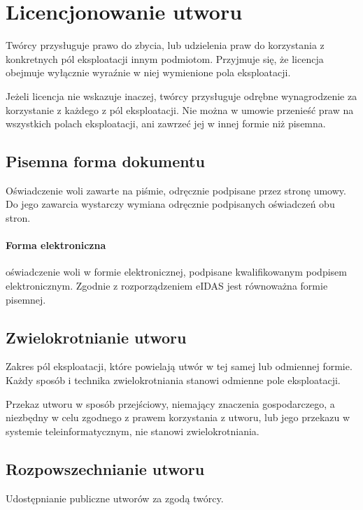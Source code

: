 \documentclass{article}
\begin{document}
\section{Licencjonowanie utworu}

Twórcy przysługuje prawo do zbycia, lub udzielenia praw do korzystania z konkretnych pól eksploatacji innym podmiotom.
Przyjmuje się, że licencja obejmuje wyłącznie wyraźnie w niej wymienione pola eksploatacji.

Jeżeli licencja nie wskazuje inaczej, twórcy przysługuje odrębne wynagrodzenie za korzystanie z każdego z pól eksploatacji. Nie można w umowie przenieść praw na wszystkich polach eksploatacji, ani zawrzeć jej w innej formie niż pisemna.

\subsection{Pisemna forma dokumentu}

Oświadczenie woli zawarte na piśmie, odręcznie podpisane przez stronę umowy. Do jego zawarcia wystarczy wymiana odręcznie podpisanych oświadczeń obu stron.

\paragraph{Forma elektroniczna}

oświadczenie woli w formie elektronicznej, podpisane kwalifikowanym podpisem elektronicznym. Zgodnie z rozporządzeniem eIDAS jest równoważna formie pisemnej.

\subsection{Zwielokrotnianie utworu}

Zakres pól eksploatacji, które powielają utwór w tej samej lub odmiennej formie. Każdy sposób i technika zwielokrotniania stanowi odmienne pole eksploatacji.

Przekaz utworu w sposób przejściowy, niemający znaczenia gospodarczego, a niezbędny w celu zgodnego z prawem korzystania z utworu, lub jego przekazu w systemie teleinformatycznym, nie stanowi zwielokrotniania.

\subsection{Rozpowszechnianie utworu}

Udostępnianie publiczne utworów za zgodą twórcy.
\end{document}
